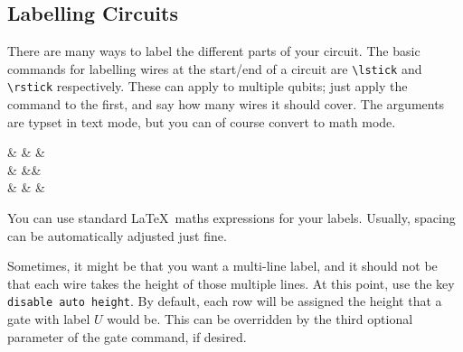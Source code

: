 \documentclass[aps,pra,10pt,nofootinbib]{revtex4-2}
\begin{document}


\subsection{Labelling Circuits}

There are many ways to label the different parts of your circuit. The basic commands for labelling wires at the start/end of a circuit are \verb!\lstick! and \verb!\rstick! respectively. These can apply to multiple qubits; just apply the command to the first, and say how many wires it should cover. The arguments are typset in text mode, but you can of course convert to math mode.
\begin{Code}
\begin{quantikz}
 &  &  & \\
 &  && \\
& & & 
\end{quantikz}
\end{Code}
You can use standard \LaTeX\ maths expressions for your labels. Usually, spacing can be automatically adjusted just fine.



Sometimes, it might be that you want a multi-line label, and it should not be that each wire takes the height of those multiple lines. At this point, use the key \verb!disable auto height!. By default, each row will be assigned the height that a gate with label $U$ would be. This can be overridden by the third optional parameter of the gate command, if desired.
\end{document}
